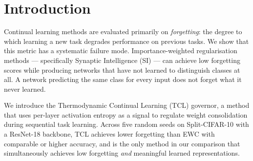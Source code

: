 
\section{Introduction}
\label{sec:intro}


Continual learning methods are evaluated primarily on \emph{forgetting}: the degree to
which learning a new task degrades performance on previous tasks.
We show that this metric has a systematic failure mode.
Importance-weighted regularisation methods --- specifically Synaptic Intelligence (SI)
 --- can achieve low forgetting scores while producing networks
that have not learned to distinguish classes at all.
A network predicting the same class for every input does not forget what it never learned.

We introduce the Thermodynamic Continual Learning (TCL) governor, a method that uses
per-layer activation entropy as a signal to regulate weight consolidation during
sequential task learning.
Across five random seeds on Split-CIFAR-10 with a ResNet-18 backbone, TCL achieves
lower forgetting than EWC  with comparable or higher accuracy,
and is the only method in our comparison that simultaneously achieves low forgetting
\emph{and} meaningful learned representations.

